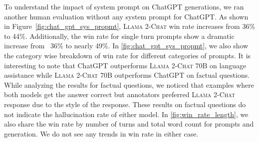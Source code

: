 \documentclass{article}
\newcommand{\modelname}{\textsc{Llama 2-Chat}\xspace}
\begin{document}
To understand the impact of system prompt on ChatGPT generations, we ran another human evaluation without any system prompt for ChatGPT. 
As shown in Figure~\ref{fig:chat_gpt_sys_propmt}, \modelname win rate increases from 36\% to 44\%. Additionally, the win rate for single turn prompts show a dramatic increase from ~36\% to nearly 49\%.  In \ref{fig:chat_gpt_sys_propmt}, we also show the category wise breakdown of win rate for different categories of prompts.  It is interesting to note that ChatGPT outperforms \modelname 70B on language assistance while \modelname 70B outperforms ChatGPT on factual questions. While analyzing the results for factual questions, we noticed that examples where both models get the answer correct but annotators preferred \modelname response due to the style of the response. These results on factual questions do not indicate the hallucination rate of either model. In \ref{fig:win_rate_length}, we also share the win rate by number of turns and total word count for prompts and generation. We do not see any trends in win rate in either case.
\end{document}
